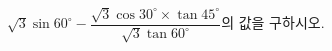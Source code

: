 $\sqrt{3}\sin 60^\circ-\dfrac{\sqrt{3}\cos 30^\circ\times\tan 45^\circ}{\sqrt{3}\tan 60^\circ}$의 값을 구하시오.
